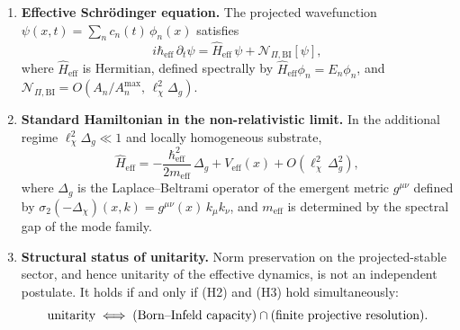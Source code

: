 \begin{theorem}
\begin{enumerate}
        \item[(C3)] \textbf{Effective Schr\"{o}dinger equation.}
        The projected wavefunction $\psi(x,t) = \sum_n c_n(t)\,\phi_n(x)$ satisfies
        \[
          i\hbar_{\mathrm{eff}}\,\partial_t\psi
          = \hat{H}_{\mathrm{eff}}\,\psi + \mathcal{N}_{\Pi,\mathrm{BI}}[\psi],
        \]
        where $\hat{H}_{\mathrm{eff}}$ is Hermitian, defined spectrally by
        $\hat{H}_{\mathrm{eff}}\phi_n = E_n\phi_n$,
        and $\mathcal{N}_{\Pi,\mathrm{BI}} = O(A_n/A_n^{\max},\,\ell_\chi^2\Delta_g)$.

        \item[(C4)] \textbf{Standard Hamiltonian in the non-relativistic limit.}
        In the additional regime $\ell_\chi^2\Delta_g \ll 1$ and locally homogeneous substrate,
        \[
          \hat{H}_{\mathrm{eff}}
          = -\frac{\hbar_{\mathrm{eff}}^2}{2m_{\mathrm{eff}}}\,\Delta_g
          + V_{\mathrm{eff}}(x)
          + O(\ell_\chi^2\,\Delta_g^2),
        \]
        where $\Delta_g$ is the Laplace--Beltrami operator of the emergent metric $g^{\mu\nu}$
        defined by $\sigma_2(-\Delta_\chi)(x,k) = g^{\mu\nu}(x)\,k_\mu k_\nu$,
        and $m_{\mathrm{eff}}$ is determined by the spectral gap of the mode family.

        \item[(C5)] \textbf{Structural status of unitarity.}
        Norm preservation on the projected-stable sector, and hence unitarity of the
        effective dynamics, is not an independent postulate.
        It holds if and only if (H2) and (H3) hold simultaneously:
        \[
          \textup{unitarity}
          \;\Longleftrightarrow\;
          (\textup{Born--Infeld capacity}) \cap (\textup{finite projective resolution}).
        \]
      \end{enumerate}
    \end{theorem}

